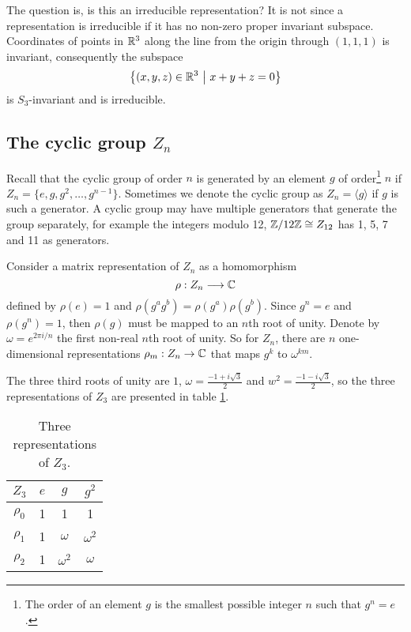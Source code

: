The question is, is this an irreducible representation? It is not since a representation is irreducible if it has no non-zero proper invariant subspace. Coordinates of points in $\mathbb{R}^3$ along the line from the origin through $(1,1,1)$ is invariant, consequently the subspace $$\left\{ (x,y,z) \in \mathbb{R}^3 \ \middle\vert \ x+y+z=0 \right\}$$ is $S_3$-invariant and is irreducible.

\subsection{The cyclic group $Z_n$}

Recall that the cyclic group of order $n$ is generated by an element $g$ of order\footnote{The order of an element $g$ is the smallest possible integer $n$ such that $g^n = e$.} $n$ if $Z_n = \{e, g, g^2, \dots, g^{n-1} \}$. Sometimes we denote the cyclic group as $Z_n = \langle g \rangle$ if $g$ is such a generator. A cyclic group may have multiple generators that generate the group separately, for example the integers modulo 12, $\mathbb{Z}/12\mathbb{Z} \cong Z_{12}$ has 1, 5, 7 and 11 as generators. 

Consider a matrix representation of $Z_n$ as a homomorphism
\[
\rho: Z_n \longrightarrow \mathbb{C}
\]
defined by $\rho(e) = 1$ and $\rho(g^a g^b) = \rho(g^a)\rho(g^b)$. Since $g^n = e$ and $\rho(g^n) = 1$, then $\rho(g)$ must be mapped to an $n$th root of unity. Denote by $\omega = e^{2\pi i/n}$ the first non-real $n$th root of unity. So for $Z_n$, there are $n$ one-dimensional representations $\rho_m: Z_n \rightarrow \mathbb{C}$ that maps $g^k$ to $\omega^{km}$.

\begin{example}[$Z_3$]
	The three third roots of unity are $1$, $\omega = \frac{-1+i\sqrt{3}}{2}$ and $w^2 = \frac{-1-i\sqrt{3}}{2}$, so the three representations of $Z_3$ are presented in table \ref{table:Z3}.
	
	\begin{table}[hbt!]
		\centering
		\caption{Three representations of $Z_3$.}
		\begin{tabular}{c | c c c}
			\label{table:Z3}
			$Z_3$ & $e$ & $g$        & $g^2$      \\ \hline
			$\rho_0$          & 1   & 1          & 1          \\
			$\rho_1$          & 1   & $\omega$   & $\omega^2$ \\
			$\rho_2$          & 1   & $\omega^2$ & $\omega$
		\end{tabular}
	\end{table}
\end{example}

